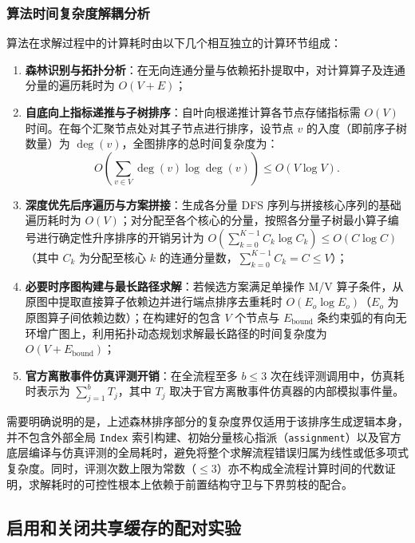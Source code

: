 \documentclass[anonymous,withtoc]{gmcm2026}
\providecommand{\tightlist}{\setlength{\itemsep}{0pt}\setlength{\parskip}{0pt}}
\begin{document}
\subsubsection{算法时间复杂度解耦分析}

算法在求解过程中的计算耗时由以下几个相互独立的计算环节组成：

\begin{enumerate}
\def\labelenumi{\arabic{enumi}.}
\tightlist
\item
  \textbf{森林识别与拓扑分析}：在无向连通分量与依赖拓扑提取中，对计算算子及连通分量的遍历耗时为 \(O(V + E)\)；
\item
  \textbf{自底向上指标递推与子树排序}：自叶向根递推计算各节点存储指标需 \(O(V)\) 时间。在每个汇聚节点处对其子节点进行排序，设节点 \(v\) 的入度（即前序子树数量）为 \(\deg(v)\)，全图排序的总时间复杂度为： \begin{equation}
O\left( \sum_{v \in V} \deg(v) \log \deg(v) \right) \le O(V \log V).
\end{equation}
\item
  \textbf{深度优先后序遍历与方案拼接}：生成各分量 DFS 序列与拼接核心序列的基础遍历耗时为 \(O(V)\)；对分配至各个核心的分量，按照各分量子树最小算子编号进行确定性升序排序的开销另计为 \(O\left(\sum_{k=0}^{K-1} C_k \log C_k\right) \le O(C \log C)\)（其中 \(C_k\) 为分配至核心 \(k\) 的连通分量数，\(\sum_{k=0}^{K-1} C_k = C \le V\)）；
\item
  \textbf{必要时序图构建与最长路径求解}：若候选方案满足单操作 M/V 算子条件，从原图中提取直接算子依赖边并进行端点排序去重耗时 \(O(E_o \log E_o)\)（\(E_o\) 为原图算子间依赖边数）；在构建好的包含 \(V\) 个节点与 \(E_{\mathrm{bound}}\) 条约束弧的有向无环增广图上，利用拓扑动态规划求解最长路径的时间复杂度为 \(O(V + E_{\mathrm{bound}})\)；
\item
  \textbf{官方离散事件仿真评测开销}：在全流程至多 \(b \le 3\) 次在线评测调用中，仿真耗时表示为 \(\sum_{j=1}^b T_j\)，其中 \(T_j\) 取决于官方离散事件仿真器的内部模拟事件量。
\end{enumerate}

需要明确说明的是，上述森林排序部分的复杂度界仅适用于该排序生成逻辑本身，并不包含外部全局 \texttt{Index} 索引构建、初始分量核心指派（\texttt{assignment}）以及官方底层编译与仿真评测的全局耗时，避免将整个求解流程错误归属为线性或低多项式复杂度。同时，评测次数上限为常数（\(\le 3\)）亦不构成全流程计算时间的代数证明，求解耗时的可控性根本上依赖于前置结构守卫与下界剪枝的配合。

\subsection{启用和关闭共享缓存的配对实验}
\end{document}
